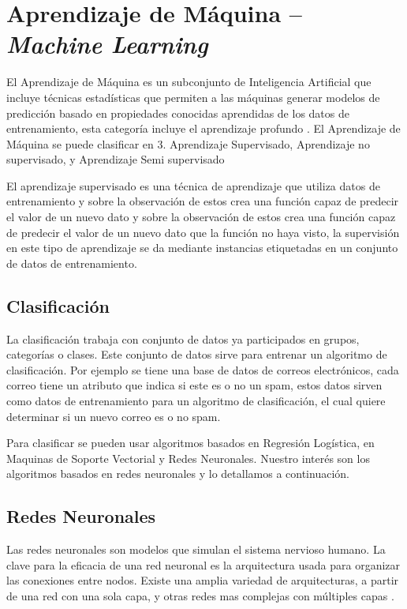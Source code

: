  
 
\section{Aprendizaje de Máquina -- \textit{Machine Learning} }\label{sec:machine-learning}

El Aprendizaje de Máquina es un subconjunto de Inteligencia Artificial  que incluye técnicas estadísticas que permiten a las máquinas generar modelos de predicción  basado en propiedades conocidas aprendidas de los datos de entrenamiento, esta categoría incluye el aprendizaje profundo \cite{smola2008ml}. El Aprendizaje de Máquina se puede clasificar en 3. Aprendizaje Supervisado, Aprendizaje no supervisado, y Aprendizaje Semi supervisado 
  
El aprendizaje supervisado es una técnica de aprendizaje que utiliza datos de entrenamiento y sobre la observación de estos crea una función capaz de predecir el valor de un nuevo dato y sobre la observación de estos crea una función capaz de predecir el valor de un nuevo dato que la función no haya visto, la supervisión en este tipo de aprendizaje se da mediante instancias etiquetadas en un conjunto de datos de entrenamiento. 

\subsection*{Clasificación}

La clasificación trabaja con conjunto de datos ya participados en grupos, categorías o clases. Este conjunto de datos sirve para entrenar un algoritmo de clasificación. Por ejemplo se tiene una base de datos de correos electrónicos, cada correo tiene un atributo que indica si este es o no un spam, estos datos sirven como datos de entrenamiento para un algoritmo de clasificación, el cual quiere determinar si un nuevo correo es o no spam. 

Para clasificar se pueden usar algoritmos basados en Regresión Logística, en Maquinas de Soporte Vectorial y Redes Neuronales. Nuestro interés son los algoritmos basados en redes neuronales y lo detallamos a continuación.

\subsection{Redes Neuronales}

Las redes neuronales son modelos que simulan el sistema nervioso humano. La clave para la eficacia de una red neuronal es la arquitectura usada para organizar las conexiones entre nodos. Existe una amplia variedad de arquitecturas, a partir de una red con una sola capa, y otras redes mas complejas con múltiples capas \cite{aggarwal2015data}.   

